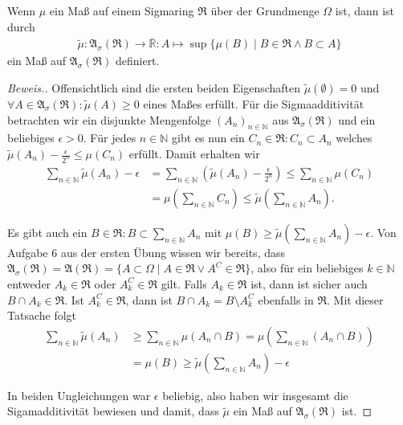 \begin{lemma}
    Wenn $\mu$ ein Maß auf einem Sigmaring $\mathfrak{R}$ über der Grundmenge $\Omega$ ist, dann ist durch 
    \begin{align*}
        \tilde{\mu}:\mathfrak{A}_\sigma(\mathfrak{R})\rightarrow\overline{\mathbb{R}}:A\mapsto\sup\{\mu(B)\mid B\in\mathfrak{R}\land B\subset A\}
    \end{align*}
    ein Maß auf $\mathfrak{A}_\sigma(\mathfrak{R})$ definiert.
\end{lemma}
\begin{proof}[Beweis.]
    Offensichtlich sind die ersten beiden Eigenschaften $\tilde{\mu}(\emptyset)=0$ und $\forall A\in\mathfrak{A}_\sigma(\mathfrak{R}):\tilde{\mu}(A)\geq 0$ eines Maßes erfüllt. Für die Sigmaadditivität betrachten wir ein disjunkte Mengenfolge $(A_n)_{n\in\mathbb{N}}$ aus $\mathfrak{A}_\sigma(\mathfrak{R})$ und ein beliebiges $\epsilon>0$. Für jedes $n\in\mathbb{N}$ gibt es nun ein $C_n\in\mathfrak{R}:C_n\subset A_n$ welches $\tilde{\mu}(A_n)-\frac{\epsilon}{2^n}\leq\mu(C_n)$ erfüllt. Damit erhalten wir
    \begin{align*}
        \sum_{n\in\mathbb{N}}\tilde{\mu}(A_n)-\epsilon&=\sum_{n\in\mathbb{N}}\left(\tilde{\mu}(A_n)-\frac{\epsilon}{2^n}\right)\leq\sum_{n\in\mathbb{N}}\mu(C_n)\\
        &=\mu\left(\sum_{n\in\mathbb{N}}C_n\right)\leq\tilde{\mu}\left(\sum_{n\in\mathbb{N}}A_n\right).
    \end{align*}
    
    Es gibt auch ein $B\in\mathfrak{R}:B\subset\sum_{n\in\mathbb{N}}A_n$ mit $\mu(B)\geq\tilde{\mu}\left(\sum_{n\in\mathbb{N}}A_n\right)-\epsilon$. Von Aufgabe 6 aus der ersten Übung wissen wir bereits, dass $\mathfrak{A}_\sigma(\mathfrak{R})=\mathfrak{A}(\mathfrak{R})=\{A\subset\Omega\mid A\in\mathfrak{R}\lor A^C\in\mathfrak{R}\}$, also für ein beliebiges $k\in\mathbb{N}$ entweder $A_k\in\mathfrak{R}$ oder $A_k^C\in\mathfrak{R}$ gilt. Falls $A_k\in\mathfrak{R}$ ist, dann ist sicher auch $B\cap A_k\in\mathfrak{R}$. Ist $A_k^C\in\mathfrak{R}$, dann ist $B\cap A_k=B\setminus A_k^C$ ebenfalls in $\mathfrak{R}$. Mit dieser Tatsache folgt
    \begin{align*}
        \sum_{n\in\mathbb{N}}\tilde{\mu}(A_n)&\geq\sum_{n\in\mathbb{N}}\mu(A_n\cap B)=\mu\left(\sum_{n\in\mathbb{N}}(A_n\cap B)\right)\\
        &=\mu(B)\geq\tilde{\mu}\left(\sum_{n\in\mathbb{N}}A_n\right)-\epsilon
    \end{align*}

    In beiden Ungleichungen war $\epsilon$ beliebig, also haben wir insgesamt die Sigamadditivität bewiesen und damit, dass $\tilde{\mu}$ ein Maß auf $\mathfrak{A}_\sigma(\mathfrak{R})$ ist.
\end{proof}